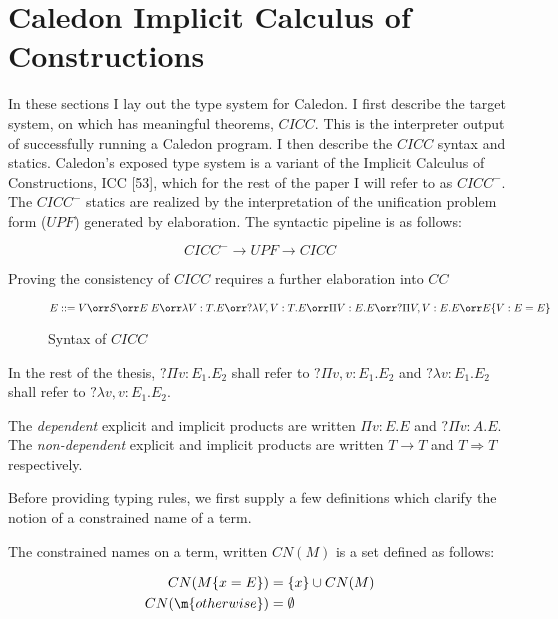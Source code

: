
\newtheorem{tcases}{Case}


\section{Caledon Implicit Calculus of Constructions}


In these sections I lay out the type system for Caledon. I first describe the target system,
on which has meaningful theorems, $CICC$. 
This is the interpreter output of successfully running a Caledon program. 
I then describe the $CICC$ syntax and statics. 
Caledon’s exposed type system is a variant of the Implicit Calculus of Constructions, ICC [53],
which for the rest of the paper I will refer to as $CICC^-$. The $CICC^-$ statics are realized
by the interpretation of the unification problem form ($UPF$) generated by elaboration.
The syntactic pipeline is as follows:


\[
CICC^- \rightarrow UPF \rightarrow CICC
\]

Proving the consistency of $CICC$ requires a further elaboration into $CC$

\begin{figure}[H]
\[ 
E ::= 
V 
\orr S 
\orr E\;E 
\orr \lambda V : T. E 
\orr ?\lambda V,V : T. E 
\orr \Pi V : E . E 
\orr ?\Pi V,V : E . E 
\orr E \{ V : E = E \}
\]

\caption{Syntax of $CICC$}
\label{cicc:syntax}
\end{figure}

In the rest of the thesis, $?\Pi v : E_1 . E_2$ shall refer to
$?\Pi v,v : E_1. E_2$ and $?\lambda v : E_1 . E_2$ shall refer to 
$?\lambda v,v : E_1 . E_2$.

The \textit{dependent} explicit and implicit products are written $\Pi v : E . E $ and $?\Pi v : A . E$. 
The \textit{non-dependent} explicit and implicit products are written $T \rightarrow T$ 
and $T \Rightarrow T$ respectively.

Before providing typing rules, we first supply a few definitions which clarify 
the notion of a constrained name of a term.

\begin{definition}
The constrained names on a term, written $CN(M)$ is a set defined as follows:

\begin{align}
CN(M \{ x = E \}) &= \{ x \} \cup CN(M)
\\
CN(\m{otherwise}) &= \emptyset
\end{align}

\end{definition}

